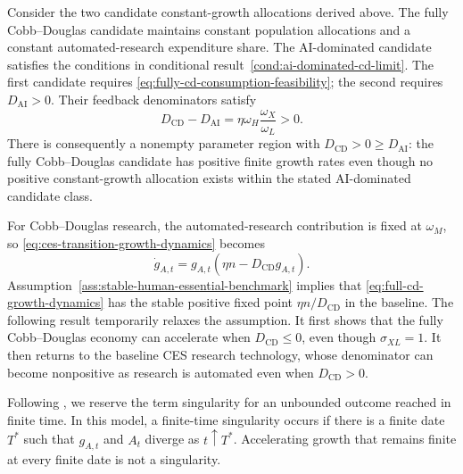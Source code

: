 \begin{conditionalresult}
\label{cond:human-essentiality-acceleration}
Consider the two candidate constant-growth allocations derived above. The fully
Cobb--Douglas candidate maintains constant population allocations and a constant
automated-research expenditure share. The AI-dominated candidate satisfies the
conditions in conditional result~\ref{cond:ai-dominated-cd-limit}. The first candidate
requires \eqref{eq:fully-cd-consumption-feasibility}; the second requires
$D_{\mathrm{AI}}>0$. Their feedback denominators satisfy
\begin{equation}
    D_{\mathrm{CD}}-D_{\mathrm{AI}}
    =
    \eta\omega_H\frac{\omega_X}{\omega_L}>0.
    \label{eq:feedback-denominator-gap}
\end{equation}
There is consequently a nonempty parameter region with
$D_{\mathrm{CD}}>0\geq D_{\mathrm{AI}}$: the fully Cobb--Douglas candidate has
positive finite growth rates even though no positive constant-growth allocation
exists within the stated AI-dominated candidate class.
\end{conditionalresult}

For Cobb--Douglas research, the automated-research contribution is fixed at $\omega_M$,
so \eqref{eq:ces-transition-growth-dynamics} becomes
\begin{equation}
    \dot g_{A,t}
    =
    g_{A,t}\left(\eta n-D_{\mathrm{CD}}g_{A,t}\right).
    \label{eq:full-cd-growth-dynamics}
\end{equation}
Assumption~\ref{ass:stable-human-essential-benchmark} implies that
\eqref{eq:full-cd-growth-dynamics} has the stable positive fixed point
$\eta n/D_{\mathrm{CD}}$ in the baseline. The following result temporarily relaxes
the assumption. It first shows that the fully Cobb--Douglas economy can accelerate
when $D_{\mathrm{CD}}\leq0$, even though $\sigma_{XL}=1$. It then returns to the
baseline CES research technology, whose denominator can become nonpositive as
research is automated even when $D_{\mathrm{CD}}>0$.

\begin{definition}
Following \citet{aghionjonesjones2019}, we reserve the term singularity for an
unbounded outcome reached in finite time. In this model, a finite-time singularity
occurs if there is a finite date $T^*$ such that $g_{A,t}$ and $A_t$ diverge as
$t\uparrow T^*$. Accelerating growth that remains finite at every finite date is not
a singularity.
\end{definition}

